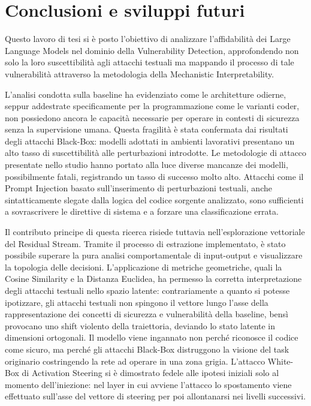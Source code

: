 \chapter{Conclusioni e sviluppi futuri}
Questo lavoro di tesi si è posto l'obiettivo di analizzare l'affidabilità dei Large Language Models nel dominio della Vulnerability Detection, approfondendo non solo la loro suscettibilità agli attacchi testuali ma mappando il processo di tale vulnerabilità attraverso la metodologia della Mechanistic Interpretability.

L'analisi condotta sulla baseline ha evidenziato come le architetture odierne, seppur addestrate specificamente per la programmazione come le varianti coder, non possiedono ancora le capacità necessarie per operare in contesti di sicurezza senza la supervisione umana. Questa fragilità è stata confermata dai risultati degli attacchi Black-Box: modelli adottati in ambienti lavorativi presentano un alto tasso di suscettibilità alle perturbazioni introdotte.
Le metodologie di attacco presentate nello studio hanno portato alla luce diverse mancanze dei modelli, possibilmente fatali, registrando un tasso di successo molto alto.
Attacchi come il Prompt Injection basato sull'inserimento di perturbazioni testuali, anche sintatticamente slegate dalla logica del codice sorgente analizzato, sono sufficienti a sovrascrivere le direttive di sistema e a forzare una classificazione errata.

Il contributo principe di questa ricerca risiede tuttavia nell'esplorazione vettoriale del Residual Stream. Tramite il processo di estrazione implementato, è stato possibile superare la pura analisi comportamentale di input-output e visualizzare la topologia delle decisioni.
L'applicazione di metriche geometriche, quali la Cosine Similarity e la Distanza Euclidea, ha permesso la corretta interpretazione degli attacchi testuali nello spazio latente: contrariamente a quanto si potesse ipotizzare, gli attacchi testuali non spingono il vettore lungo l'asse della rappresentazione dei concetti di sicurezza e vulnerabilità della baseline, bensì provocano uno shift violento della traiettoria, deviando lo stato latente in dimensioni ortogonali. Il modello viene ingannato non perché riconosce il codice come sicuro, ma perché gli attacchi Black-Box distruggono la visione del task originario costringendo la rete ad operare in una zona grigia. L'attacco White-Box di Activation Steering si è dimostrato fedele alle ipotesi iniziali solo al momento dell'iniezione: nel layer in cui avviene l'attacco lo spostamento viene effettuato sull'asse del vettore di steering per poi allontanarsi nei livelli successivi.

